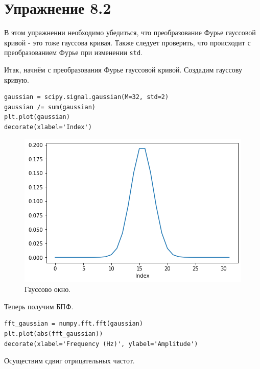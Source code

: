 \documentclass[a4paper, 14pt]{extarticle}
\begin{document}
    \newpage

    \section{Упражнение 8.2}
    \label{sec:task2}

    В этом упражнении необходимо убедиться, что преобразование Фурье гауссовой кривой - это тоже гауссова кривая.
    Также следует проверить, что происходит с преобразованием Фурье при изменении \texttt{std}.

    Итак, начнём с преобразования Фурье гауссовой кривой. Создадим гауссову кривую.

    \begin{lstlisting}[caption= Создание гауссовой кривой., label={lst:task2_gaussian}]
gaussian = scipy.signal.gaussian(M=32, std=2)
gaussian /= sum(gaussian)
plt.plot(gaussian)
decorate(xlabel='Index')    \end{lstlisting}

    \begin{figure}[h]
        \centering
        \includegraphics[width=0.8\linewidth]{resources/Images/task2_gaussian}
        \caption{Гауссово окно.}
        \label{fig:task2_gaussian}
    \end{figure}

    Теперь получим БПФ.

    \begin{lstlisting}[caption= Получение БПФ., label={lst:task2_fft}]
fft_gaussian = numpy.fft.fft(gaussian)
plt.plot(abs(fft_gaussian))
decorate(xlabel='Frequency (Hz)', ylabel='Amplitude')   \end{lstlisting}

    Осуществим сдвиг отрицательных частот.
\end{document}
